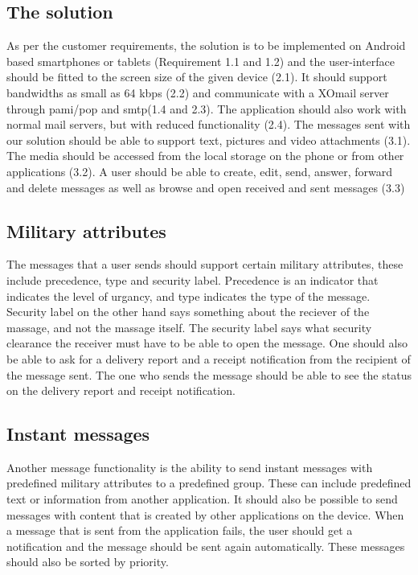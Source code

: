 \subsection{The solution}
As per the customer requirements, the solution is to be implemented on Android based smartphones or tablets (Requirement 1.1 and 1.2) and the user-interface should be fitted to the screen size of the given device (2.1). It should support bandwidths as small as 64 kbps (2.2) and communicate with a XOmail server through \gls{pami}/\gls{pop} and \gls{smtp}(1.4 and 2.3). The application should also work with normal mail servers, but with reduced functionality (2.4).
\newline
\newline
The messages sent with our solution should be able to support text, pictures and video attachments (3.1). The media should be accessed from the local storage on the phone or from other applications (3.2). A user should be able to create, edit, send, answer, forward and delete messages as well as browse and open received and sent messages (3.3)

\subsection{Military attributes}
The messages that a user sends should support certain military attributes, these include precedence, type and security label. Precedence is an indicator that indicates the level of urgancy, and type indicates the type of the message. Security label on the other hand says something about the reciever of the massage, and not the massage itself. The security label says what security clearance the receiver must have to be able to open the message.
\newline
\newline
One should also be able to ask for a delivery report and a receipt notification from the recipient of the message sent. The one who sends the message should be able to see the status on the delivery report and receipt notification.

\subsection{Instant messages}
Another message functionality is the ability to send instant messages with predefined military attributes to a predefined group. These can include predefined text or information from another application. It should also be possible to send messages with content that is created by other applications on the device.
\newline
\newline
When a message that is sent from the application fails, the user should get a notification and the message should be sent again automatically. These messages should also be sorted by priority.

